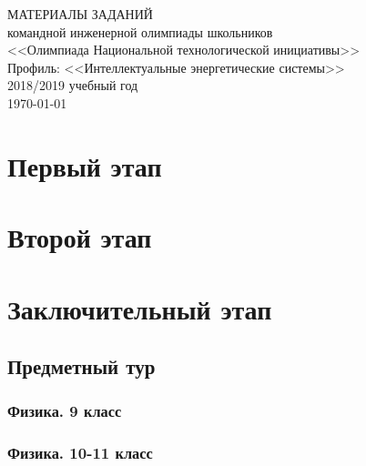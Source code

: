 \documentclass[a4paper,12pt,oneside]{book}
\begin{document}
\begin{titlepage}
    \begin{center}
        \huge{МАТЕРИАЛЫ ЗАДАНИЙ} \\
        \Large{командной инженерной олимпиады школьников} \\
        \Large{<<Олимпиада Национальной технологической инициативы>>} \\
        \Large{Профиль: <<Интеллектуальные энергетические системы>>} \\
        \large{2018/2019 учебный год} \\
        \vspace{2cm}
        \Large{\today}  
    \end{center}
\end{titlepage}

\setcounter{tocdepth}{1}

\tableofcontents

\part{Первый этап}

%
%

\part{Второй этап}



\part{Заключительный этап}
 
\clearpage
\chapter{Предметный тур}

\section{Физика. 9 класс}
%

\section{Физика. 10-11 класс}
%

%
%
\end{document}
